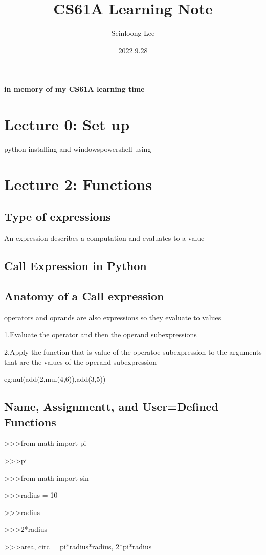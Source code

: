 \documentclass{article}
\title{CS61A Learning Note}
\author{Seinloong Lee}
\date{2022.9.28}
\begin{document}
\maketitle
\begin{center}




\textbf{in memory of my CS61A learning time}
\end{center}

\newpage
\section{Lecture 0: Set up}
python installing and windowspowershell using
\par

\newpage
\section{Lecture 2: Functions}
\subsection{Type of expressions}
An expression describes a computation and evaluates to a value
\subsection{Call Expression in Python}
\subsection{Anatomy of a Call expression}
operators and oprands are also expressions
so they evaluate to values

1.Evaluate the operator and then the operand subexpressions
\par
2.Apply the function that is value of the operatoe subexpression to the arguments that are the values of the operand subexpression
\par
eg:nul(add(2,mul(4,6)),add(3,5))
\par
\subsection{Name, Assignmentt, and User=Defined Functions}
>>>from math import pi \par
>>>pi\par
>>>from math import sin\par
>>>radius = 10\par
>>>radius\par
>>>2*radius\par
>>>area, circ = pi*radius*radius, 2*pi*radius\par
\end{document}
